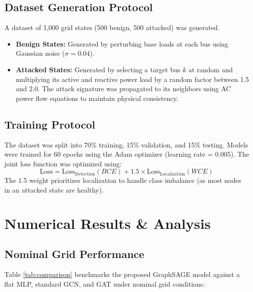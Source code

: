 \documentclass[journal]{IEEEtran}
\begin{document}
\subsection{Dataset Generation Protocol}
A dataset of 1,000 grid states (500 benign, 500 attacked) was generated.
\begin{itemize}
    \item \textbf{Benign States:} Generated by perturbing base loads at each bus using Gaussian noise ($\sigma = 0.04$).
    \item \textbf{Attacked States:} Generated by selecting a target bus $k$ at random and multiplying its active and reactive power load by a random factor between 1.5 and 2.0. The attack signature was propagated to its neighbors using AC power flow equations to maintain physical consistency.
\end{itemize}

\subsection{Training Protocol}
The dataset was split into 70\% training, 15\% validation, and 15\% testing. Models were trained for 60 epochs using the Adam optimizer (learning rate = 0.005). The joint loss function was optimized using:
\begin{equation}
\text{Loss} = \text{Loss}_{\text{Detection}} (BCE) + 1.5 \times \text{Loss}_{\text{Localization}} (WCE)
\end{equation}
The 1.5 weight prioritizes localization to handle class imbalance (as most nodes in an attacked state are healthy).

\section{Numerical Results \& Analysis}

\subsection{Nominal Grid Performance}
Table \ref{tab:comparison} benchmarks the proposed GraphSAGE model against a flat MLP, standard GCN, and GAT under nominal grid conditions:

\begin{table}[htbp]
  \caption{Performance Comparison under Nominal Grid Layout}
  \label{tab:comparison}
  \centering
\end{table}
\end{document}
